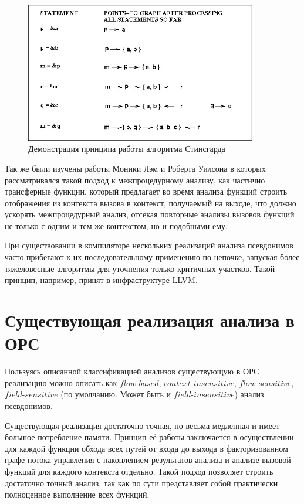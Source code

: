 \begin{figure}[H]
\centering
\caption{\label{fig:steensgaard} Демонстрация принципа работы алгоритма Стинсгарда}
\includegraphics[width=0.9\textwidth]{img/steensgaard.jpg}
\end{figure}

Так же были изучены работы Моники Лэм и Роберта Уилсона  в которых рассматривался такой подход к межпроцедурному анализу, как частично трансферные функции, который предлагает во время анализа функций строить отображения из контекста вызова в контекст, получаемый на выходе, что должно ускорять межпроцедурный анализ, отсекая повторные анализы вызовов функций не только с одним и тем же контекстом, но и подобными ему.

При существовании в компиляторе нескольких реализаций анализа псевдонимов часто прибегают к их последовательному применению по цепочке, запуская более тяжеловесные алгоритмы для уточнения только критичных участков. Такой принцип, например, принят в инфраструктуре LLVM.

\section{Существующая реализация анализа в ОРС}

Пользуясь описанной классификацией анализов существующую в ОРС реализацию можно описать как $flow$-$based$, $context$-$insensitive$, $flow$-$sensitive$, $field$-$sensitive$ (по умолчанию. Может быть и $field$-$insensitive$) анализ псевдонимов.

Существующая реализация достаточно точная, но весьма медленная и имеет большое потребление памяти. Принцип её работы заключается в осуществлении для каждой функции обхода всех путей от входа до выхода в факторизованном графе потока управления с накоплением результатов анализа и анализе вызовой функций для каждого контекста отдельно. Такой подход позволяет строить достаточно точный анализ, так как по сути представляет собой практически полноценное выполнение всех функций.


